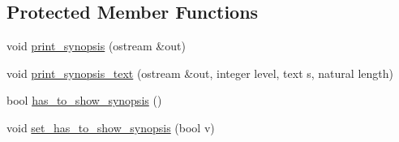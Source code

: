 \subsection*{Protected Member Functions}
\begin{DoxyCompactItemize}
\item 
void \hyperlink{classez_1_1arguments_1_1ArgumentParser_ac9a85ce0fb70333c02c19cb0310fe685}{print\+\_\+synopsis} (ostream \&out)
\item 
void \hyperlink{classez_1_1arguments_1_1ArgumentParser_a6bd8d09ae905811e2dc082f0574cbcbf}{print\+\_\+synopsis\+\_\+text} (ostream \&out, integer level, text s, natural length)
\item 
bool \hyperlink{classez_1_1arguments_1_1ArgumentParser_ace31a847d871c5c6c85db03716fa7047}{has\+\_\+to\+\_\+show\+\_\+synopsis} ()
\item 
void \hyperlink{classez_1_1arguments_1_1ArgumentParser_a0eedf118bbdf897606e5a0ebf6183102}{set\+\_\+has\+\_\+to\+\_\+show\+\_\+synopsis} (bool v)
\end{DoxyCompactItemize}
